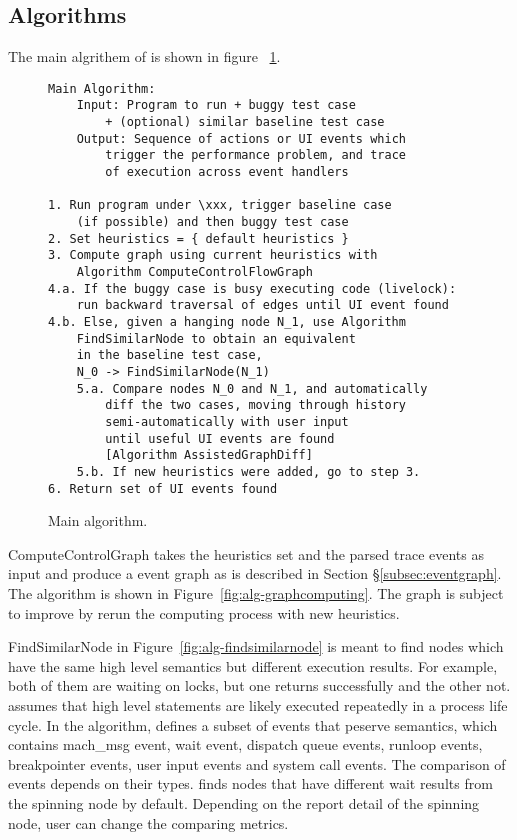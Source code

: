 \subsection{\xxx Algorithms} 
The main algrithem of \xxx is shown in figure ~\ref{fig:alg-main}.
\begin{figure}[H]
\footnotesize\begin{verbatim}
Main Algorithm:
    Input: Program to run + buggy test case
        + (optional) similar baseline test case
    Output: Sequence of actions or UI events which
        trigger the performance problem, and trace
        of execution across event handlers

1. Run program under \xxx, trigger baseline case
    (if possible) and then buggy test case
2. Set heuristics = { default heuristics }
3. Compute graph using current heuristics with
    Algorithm ComputeControlFlowGraph
4.a. If the buggy case is busy executing code (livelock):
    run backward traversal of edges until UI event found
4.b. Else, given a hanging node N_1, use Algorithm
    FindSimilarNode to obtain an equivalent
    in the baseline test case,
    N_0 -> FindSimilarNode(N_1)
    5.a. Compare nodes N_0 and N_1, and automatically
        diff the two cases, moving through history
        semi-automatically with user input
	    until useful UI events are found
        [Algorithm AssistedGraphDiff]
    5.b. If new heuristics were added, go to step 3.
6. Return set of UI events found
\end{verbatim}
    \caption{Main \xxx algorithm.}
    \label{fig:alg-main}
\end{figure}

ComputeControlGraph takes the heuristics set and the parsed trace
events as input and produce a event graph as is described in
Section \S\ref{subsec:eventgraph}. The algorithm is shown in
Figure~\ref{fig:alg-graphcomputing}. The graph is subject to improve by rerun
the computing process with new heuristics.

FindSimilarNode in Figure~\ref{fig:alg-findsimilarnode} is meant to find nodes
which have the same high level semantics but different execution results.
For example, both of them are waiting on locks, but one returns successfully and the other not.
\xxx assumes that high level statements are likely executed repeatedly in a process life cycle.
In the algorithm, \xxx defines a subset of
events that peserve semantics, which contains mach\_msg event, wait event,
dispatch queue events, runloop events, breakpointer events, user input events
and system call events.
The comparison of events depends on their types.
\xxx finds nodes that have different wait results from the spinning node by default.
Depending on the report detail of the spinning node, user can
change the comparing metrics.

